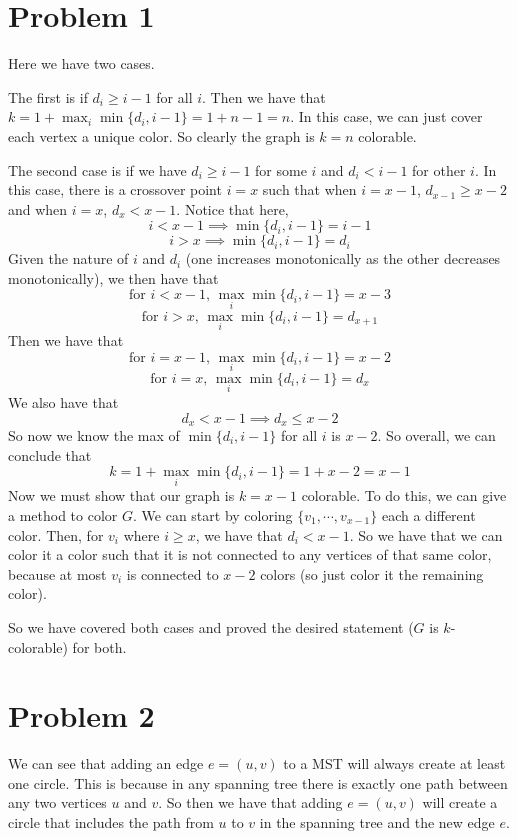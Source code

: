 \documentclass{article}
\begin{document}
\section*{Problem 1}
Here we have two cases.

The first is if $d_i \geq i - 1$ for all $i$. Then
we have that $k = 1 + \max_i \min\{d_i, i-1\} = 1 + n - 1 = n$. In this
case, we can just cover each vertex a unique color. So clearly the graph is
$k = n$ colorable.

The second case is if we have $d_i \geq i - 1$ for some $i$
and $ d_i < i - 1$ for other $i$. In this case, there is a crossover point
$i = x$ such that when $i = x - 1$, $d_{x-1} \geq x - 2$ and when $i = x$,
$d_{x} < x - 1$. Notice that here,
\[ i < x - 1 \implies \min\{d_i, i - 1\} = i - 1 \]
\[ i > x \implies \min\{d_i, i - 1\} = d_i \]
Given the nature of $i$ and $d_i$ (one increases monotonically as the other
decreases monotonically), we then have that
\[ \text{for } i < x - 1 \text{, } \max_i \min\{d_i, i-1\} = x - 3 \]
\[ \text{for } i > x \text{, } \max_i \min\{d_i, i-1\} = d_{x+1} \]
Then we have that
\[ \text{for } i = x - 1 \text{, } \max_i \min\{d_i, i-1\} = x - 2 \]
\[ \text{for } i = x \text{, } \max_i \min\{d_i, i-1\} = d_x \]
We also have that
\[ d_x < x - 1 \implies d_x \leq x - 2 \]
So now we know the max of $\min\{d_i, i-1\}$ for all $i$ is $x - 2$.
So overall, we can conclude that
\[ k = 1 + \max_i \min \{d_i, i - 1\} = 1 + x - 2 = x - 1 \]
Now we must show that our graph is $k = x - 1$ colorable. To do this, we can
give a method to color $G$. We can start by coloring $\{v_1, \cdots, v_{x-1}\}$
each a different color. Then, for $v_i$ where $i \geq x$, we have that
$d_i < x - 1$. So we have that we can color it a color such that it is not
connected to any vertices of that same color, because at most $v_i$ is connected
to $x - 2$ colors (so just color it the remaining color).

So we have covered both cases and proved the desired statement ($G$ is
$k$-colorable) for both.

\section*{Problem 2}
We can see that adding an edge $e = (u,v)$ to a MST will always create
at least one circle. This is because in any spanning tree there is exactly one
path between any two vertices $u$ and $v$. So then we have that adding $e = (u,v)$
will create a circle that includes the path from $u$ to $v$ in the spanning
tree and the new edge $e$.
\end{document}
